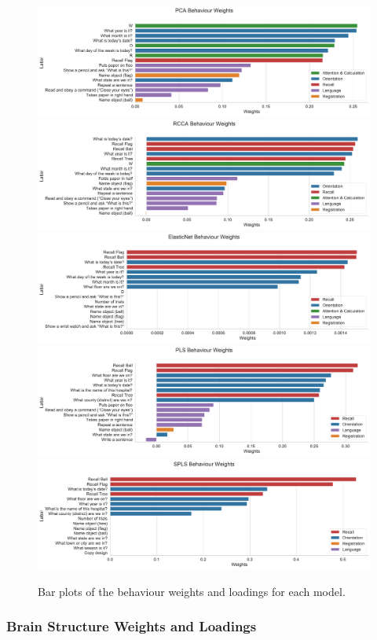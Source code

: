 \begin{figure}
\centering
\includegraphics[width=0.8\linewidth]{figures/adni/PCA behaviour weights}
\includegraphics[width=0.8\linewidth]{figures/adni/RCCA behaviour weights}
\includegraphics[width=0.8\linewidth]{figures/adni/ElasticNet behaviour weights}
\includegraphics[width=0.8\linewidth]{figures/adni/PLS behaviour weights}
\includegraphics[width=0.8\linewidth]{figures/adni/SPLS behaviour weights}
\caption{Bar plots of the behaviour weights and loadings for each model.}\label{fig:adni-beh}
\end{figure}

\subsubsection{Brain Structure Weights and Loadings}

